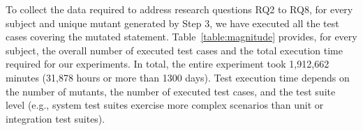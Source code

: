  



%



{To collect the data required to address research questions RQ2 to RQ8, for every subject and unique mutant generated by Step 3, we have executed all the test cases covering the mutated statement. Table~\ref{table:magnitude} provides, for every subject, the overall number of executed test cases and the total execution time required for our experiments. In total, the entire experiment took 1,912,662 minutes (31,878 hours or more than 1300 days). Test  execution time depends on the number of mutants, the number of executed test cases, and the test suite level (e.g., system test suites exercise more complex scenarios than unit or integration test suites).}  




